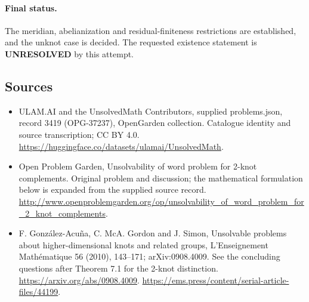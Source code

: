 \documentclass[11pt,a4paper]{article}
\begin{document}
\paragraph{Final status.}
The meridian, abelianization and residual-finiteness restrictions are established, and the unknot case is decided. The requested existence statement is \textbf{UNRESOLVED} by this attempt.

\subsection{Sources}
\begin{itemize}
\item[S1] ULAM.AI and the UnsolvedMath Contributors, supplied problems.json, record 3419 (OPG-37237), OpenGarden collection. Catalogue identity and source transcription; CC BY 4.0.
\url{https://huggingface.co/datasets/ulamai/UnsolvedMath}.
\item[S2] Open Problem Garden, Unsolvability of word problem for 2-knot complements. Original problem and discussion; the mathematical formulation below is expanded from the supplied source record.
\url{http://www.openproblemgarden.org/op/unsolvability_of_word_problem_for_2_knot_complements}.
\item[S3] F. González-Acuña, C. McA. Gordon and J. Simon, Unsolvable problems about higher-dimensional knots and related groups, L'Enseignement Mathématique 56 (2010), 143--171; arXiv:0908.4009. See the concluding questions after Theorem 7.1 for the 2-knot distinction.
\url{https://arxiv.org/abs/0908.4009}.
\url{https://ems.press/content/serial-article-files/44199}.
\end{itemize}
\end{document}

